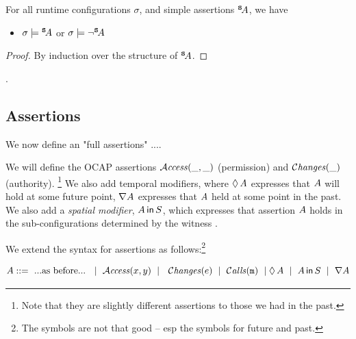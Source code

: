 \begin{lemma}
For all runtime configurations $\sigma$, and simple assertions ${^{\small{{\mbox{\tt{s}}}}}\! A}$, we have
\begin{itemize}
\item
$\sigma \models {^{\small{{\mbox{\tt{s}}}}}\! A}$ or $\sigma \models \neg{^{\small{{\mbox{\tt{s}}}}}\! A}$
\end{itemize}
\end{lemma}
\begin{proof} By induction over the structure of ${^{\small{{\mbox{\tt{s}}}}}\! A}$. \end{proof}.
 
 \subsection{Assertions}

We now define an "full assertions" ....

We will define the OCAP assertions ${\mathcal{A}}\textrm{\textit{ccess}}(\_,\_)$  (permission)
and   $\mathcal{C}\textrm{\textit{hanges}}(\_)$ (authority). \footnote{Note that they are slightly different
assertions to those we had in the past.}
We also add temporal modifiers, where $\lozenge\, A$ expresses that $A$ will hold at some future point,
$\nabla A$ expresses that $A$ held at some point in the past.
We also add a {\em spatial modifier}, $A\,{\bf{\sf {in}}}\, S$, which expresses that assertion $A$ holds in
the sub-configurations determined by the witness .

We extend the syntax for assertions as follows:\footnote{The symbols are not that good -- esp the symbols for future and past.}

\begin{definition}[Assertions]
$$\A ::=\  ... \mbox{as before} ...\ \ \mid \ \CanAccess x y \ \mid\  \ \Changes e \ \mid\  \Calls{m} \ \mid\  \\ \Future \A \ \mid \ \Using \A S  \ \mid \  \Past \A$$
\end{definition}\M



